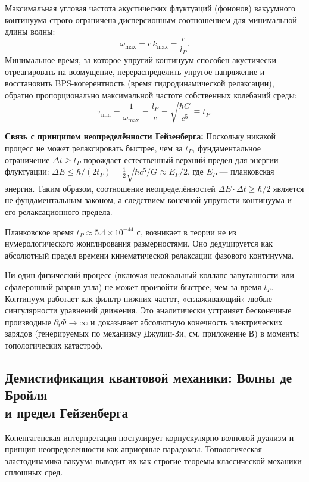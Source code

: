 \documentclass[11pt,a4paper]{article}
\begin{document}
Максимальная угловая частота акустических флуктуаций (фононов) вакуумного континуума строго ограничена дисперсионным соотношением для минимальной длины волны:
\begin{equation}
	\omega_{\text{max}} = c\, k_{\text{max}} = \frac{c}{l_P}.
\end{equation}
Минимальное время, за которое упругий континуум способен акустически отреагировать на возмущение, перераспределить упругое напряжение и восстановить BPS-когерентность (время гидродинамической релаксации), обратно пропорционально максимальной частоте собственных колебаний среды:
\begin{equation}
	\tau_{\text{min}} = \frac{1}{\omega_{\text{max}}} = \frac{l_P}{c} = \sqrt{\frac{\hbar G}{c^5}} \equiv t_P.
\end{equation}

\textbf{Связь с принципом неопределённости Гейзенберга:}
Поскольку никакой процесс не может релаксировать быстрее, чем за $t_P$, фундаментальное ограничение $\Delta t \ge t_P$ порождает естественный верхний предел для энергии флуктуации: $\Delta E \le \hbar / (2 t_P) = \frac12 \sqrt{\hbar c^5 / G} \approx E_P/2$, где $E_P$ — планковская энергия. Таким образом, соотношение неопределённостей $\Delta E \cdot \Delta t \ge \hbar/2$ является не фундаментальным законом, а следствием конечной упругости континуума и его релаксационного предела.

Планковское время $t_P \approx 5.4\times10^{-44}$ с, возникает в теории не из нумерологического жонглирования размерностями. Оно дедуцируется как абсолютный предел времени кинематической релаксации фазового континуума.

Ни один физический процесс (включая нелокальный коллапс запутанности или сфалеронный разрыв узла) не может произойти быстрее, чем за время $t_P$. Континуум работает как фильтр нижних частот, «сглаживающий» любые сингулярности уравнений движения. Это аналитически устраняет бесконечные производные $\partial_t \Phi \to \infty$ и доказывает абсолютную конечность электрических зарядов (генерируемых по механизму Джулии-Зи, см. приложение В) в моменты топологических катастроф.
	
\subsection{Демистификация квантовой механики: Волны де Бройля\\ и предел Гейзенберга}
Копенгагенская интерпретация постулирует корпускулярно-волновой дуализм и принцип неопределенности как априорные парадоксы. Топологическая эластодинамика вакуума выводит их как строгие теоремы классической механики сплошных сред.
\end{document}
